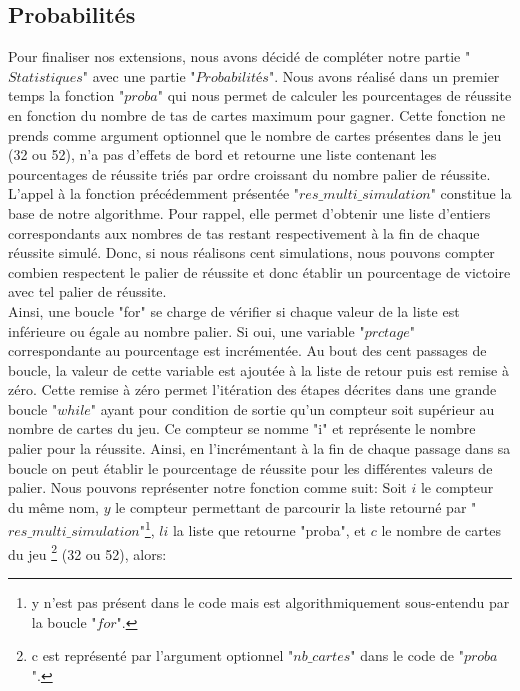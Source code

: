 \documentclass[10pt,a4paper,french,titlepage]{article}
\theoremstyle{definition}
\begin{document}
\subsection{Probabilités}
Pour finaliser nos extensions, nous avons décidé de compléter notre partie "$Statistiques$" avec une partie "$Probabilités$". Nous avons réalisé dans un premier temps la fonction "$proba$" qui nous permet de calculer les pourcentages de réussite en fonction du nombre de tas de cartes maximum pour gagner. Cette fonction
ne prends comme argument optionnel que le nombre de cartes présentes dans le jeu (32 ou 52), n'a pas d'effets de bord et retourne une liste contenant les pourcentages 
de réussite triés par ordre croissant du nombre palier de réussite. L'appel à la fonction précédemment présentée "$res\_multi\_simulation$" constitue la base de notre
algorithme. Pour rappel, elle permet d'obtenir une liste d'entiers correspondants aux nombres de tas restant respectivement à la fin de chaque réussite simulé.
Donc, si nous réalisons cent simulations, nous pouvons compter combien respectent le palier de réussite et donc établir un pourcentage de victoire avec tel palier 
de réussite.\\
Ainsi, une boucle "for" se charge de vérifier si chaque valeur de la liste est inférieure ou égale au nombre palier. Si oui, une variable "$prctage$" 
correspondante au pourcentage est incrémentée. Au bout des cent passages de boucle, la valeur de cette variable est ajoutée à la liste de retour puis est remise à 
zéro. Cette remise à zéro permet l'itération des étapes décrites dans une grande boucle "$while$" ayant pour condition de sortie qu'un compteur soit supérieur au nombre 
de cartes du jeu. Ce compteur se nomme "i" et représente le nombre palier pour la réussite. Ainsi, en l'incrémentant à la fin de chaque passage dans sa boucle on peut
établir le pourcentage de réussite pour les différentes valeurs de palier. Nous pouvons représenter notre fonction comme suit:
Soit $i$ le compteur du même nom, $y$ le compteur permettant de parcourir la liste retourné par "$res\_multi\_simulation$"\footnote{y n'est pas présent dans le code mais est algorithmiquement sous-entendu par la boucle "$for$".}, $li$ la liste que retourne "proba", et $c$ le nombre de cartes du jeu \footnote{c est représenté par l'argument optionnel "$nb\_cartes$" dans le code de "$proba$".} (32 ou 52), alors:
\end{document}
